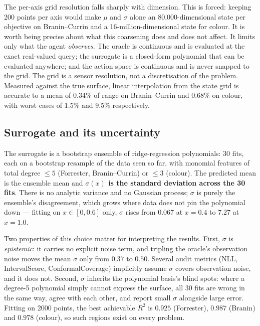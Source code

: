 \documentclass[11pt]{article}
\begin{document}
The per-axis grid resolution falls sharply with dimension. This is forced: keeping 200 points per axis would make $\mu$ and $\sigma$ alone an 80{,}000-dimensional state per objective on Branin--Currin and a 16-million-dimensional state for colour. It is worth being precise about what this coarsening does and does not affect. It limits only what the agent \emph{observes}. The oracle is continuous and is evaluated at the exact real-valued query; the surrogate is a closed-form polynomial that can be evaluated anywhere; and the action space is continuous and is never snapped to the grid. The grid is a sensor resolution, not a discretisation of the problem. Measured against the true surface, linear interpolation from the state grid is accurate to a mean of $0.34\%$ of range on Branin--Currin and $0.68\%$ on colour, with worst cases of $1.5\%$ and $9.5\%$ respectively.

\subsection{Surrogate and its uncertainty}

The surrogate is a bootstrap ensemble of ridge-regression polynomials: 30 fits, each on a bootstrap resample of the data seen so far, with monomial features of total degree $\le 5$ (Forrester, Branin--Currin) or $\le 3$ (colour). The predicted mean is the ensemble mean and \textbf{$\sigma(x)$ is the standard deviation across the 30 fits}. There is no analytic variance and no Gaussian process; $\sigma$ is purely the ensemble's disagreement, which grows where data does not pin the polynomial down --- fitting on $x \in [0, 0.6]$ only, $\sigma$ rises from $0.067$ at $x = 0.4$ to $7.27$ at $x = 1.0$.

Two properties of this choice matter for interpreting the results. First, $\sigma$ is \emph{epistemic}: it carries no explicit noise term, and tripling the oracle's observation noise moves the mean $\sigma$ only from $0.37$ to $0.50$. Several audit metrics (NLL, IntervalScore, ConformalCoverage) implicitly assume $\sigma$ covers observation noise, and it does not. Second, $\sigma$ inherits the polynomial basis's blind spots: where a degree-5 polynomial simply cannot express the surface, all 30 fits are wrong in the same way, agree with each other, and report small $\sigma$ alongside large error. Fitting on 2000 points, the best achievable $R^2$ is $0.925$ (Forrester), $0.987$ (Branin) and $0.978$ (colour), so such regions exist on every problem.
\end{document}
